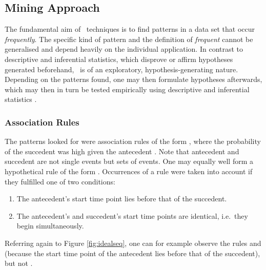 \subsection{Mining Approach}
\label{sec:mining}
The fundamental aim of \fpmlower\ techniques is to find patterns in a data set that occur \emph{frequently}. The specific kind of pattern and the definition of \emph{frequent} cannot be generalised and depend heavily on the individual application. In contrast to descriptive and inferential statistics, which disprove or affirm hypotheses generated beforehand, \fpmlower\ is of an exploratory, hypothesis-generating nature. Depending on the patterns found, one may then formulate hypotheses afterwards, which may then in turn be tested empirically using descriptive and inferential statistics \cite[]{rohlfing18,han12}.%

\subsubsection{Association Rules}
The patterns \citet{rohlfing18} looked for were association rules of the form , where the probability of the succedent  was high given the antecedent . Note that antecedent and succedent are not single events but sets of events. One may equally well form a hypothetical rule of the form . Occurrences of a rule were taken into account if they fulfilled one of two conditions:

\begin{enumerate}
	\item The antecedent's start time point lies before that of the succedent.
	\item The antecedent's and succedent's start time points are identical, i.e.\ they begin simultaneously.
\end{enumerate}

Referring again to Figure \ref{fig:idealseq}, one can for example observe the rules  and  (because the start time point of the antecedent lies before that of the succedent), but not .

